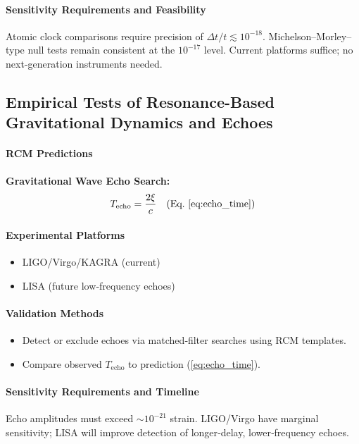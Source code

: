 \paragraph{Sensitivity Requirements and Feasibility}
Atomic clock comparisons require precision of $\Delta t/t\lesssim10^{-18}$. Michelson–Morley–type null tests remain consistent at the $10^{-17}$ level. Current platforms suffice; no next‐generation instruments needed.

\subsection{Empirical Tests of Resonance-Based Gravitational Dynamics and Echoes}

\paragraph{RCM Predictions}
\begin{framed}
\noindent\textbf{Gravitational Wave Echo Search:}
\[
T_{\mathrm{echo}} = \frac{2\xi}{c}
\quad\text{(Eq.~\ref{eq:echo_time})}
\]
\end{framed}

\paragraph{Experimental Platforms}
\begin{itemize}
  \item LIGO/Virgo/KAGRA (current)  
  \item LISA (future low‐frequency echoes)
\end{itemize}

\paragraph{Validation Methods}
\begin{itemize}
  \item Detect or exclude echoes via matched‐filter searches using RCM templates.  
  \item Compare observed $T_{\mathrm{echo}}$ to prediction (\ref{eq:echo_time}).  
\end{itemize}

\paragraph{Sensitivity Requirements and Timeline}
Echo amplitudes must exceed $\sim10^{-21}$ strain. LIGO/Virgo have marginal sensitivity; LISA will improve detection of longer‐delay, lower‐frequency echoes.

